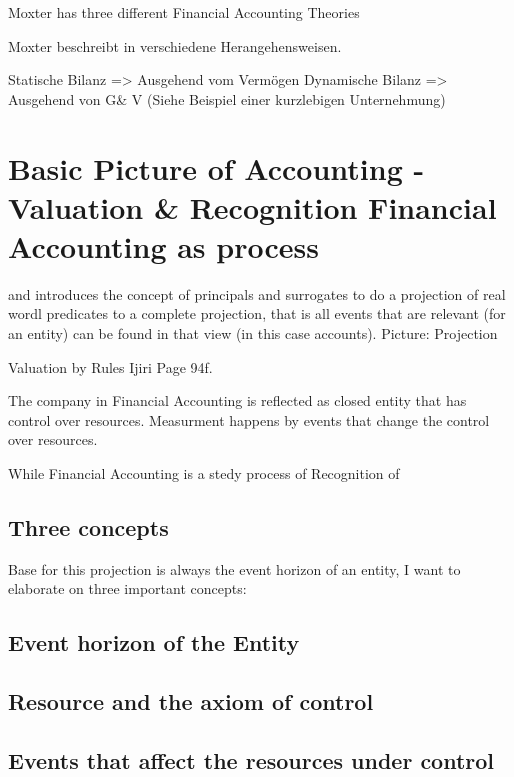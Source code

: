 Moxter has three different Financial Accounting Theories

Moxter beschreibt in \cite{moxter1984BilanzlehreI} verschiedene Herangehensweisen.

Statische Bilanz => Ausgehend vom Vermögen
Dynamische Bilanz => Ausgehend von G\&
V (Siehe Beispiel einer kurzlebigen Unternehmung)



\section{Basic Picture of Accounting - Valuation \& Recognition Financial Accounting as process}





and introduces the concept of principals and surrogates to do a projection of real wordl predicates to a complete projection, that is all events that are relevant (for an entity) can be found in that view (in this case accounts).
Picture: Projection

Valuation by Rules Ijiri Page 94f.


The company in Financial Accounting is reflected as closed entity that has control over resources.
Measurment happens by events that change the control over resources.


While Financial Accounting is a stedy process of Recognition of 




\subsection{Three concepts}
Base for this projection is always the event horizon of an entity, I want to elaborate on three important concepts:

\subsection{Event horizon of the Entity}

\subsection{Resource and the axiom of control}

\subsection{Events that affect the resources under control}


